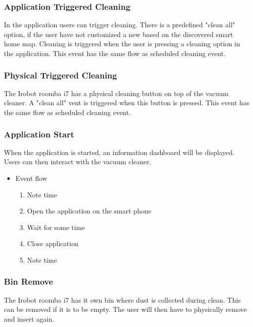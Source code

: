 \subsubsection{Application Triggered Cleaning}
In the application users can trigger cleaning. There is a predefined "clean all" option, if the user have not customized a new based on the discovered smart home map. Cleaning is triggered when the user is pressing a cleaning option in the application. This event has the same flow as scheduled cleaning event.


\subsubsection{Physical Triggered Cleaning}
The Irobot roomba i7 has a physical cleaning button on top of the vacuum cleaner. A "clean all" vent is triggered when this button is pressed. This event has the same flow as scheduled cleaning event.

\subsubsection{Application Start}
When the application is started, an information dashboard will be displayed. Users can then interact with the vacuum cleaner. 

\begin{itemize}
    \item Event flow \begin{enumerate}
                                    \item Note time
                                    \item Open the application on the smart phone
                                    \item Wait for some time
                                    \item Close application
                                    \item Note time
                                \end{enumerate}
\end{itemize}

\subsubsection{Bin Remove}
The Irobot roomba i7 has it own bin where dust is collected during clean. This can be removed if it is to be empty. The user will then have to physically remove and insert again. 

